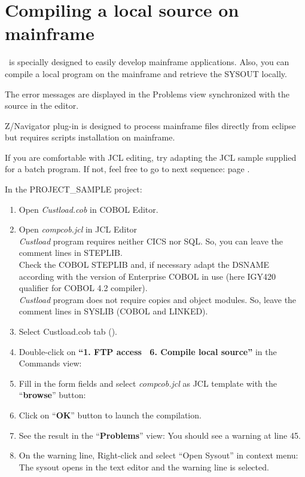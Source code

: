 \chapter{Compiling a local source on mainframe}

\mxproduct~is specially designed to easily develop mainframe applications. Also, you can compile a local program on the mainframe and retrieve the SYSOUT locally. 

The error messages are displayed in the Problems view synchronized with the source in the editor.

Z/Navigator plug-in is designed to process mainframe files directly from eclipse but requires scripts installation on mainframe.

If you are comfortable with JCL editing, try adapting the JCL sample supplied for a batch program. If not, feel free to go to next sequence:  page \pageref{chap:PDS}.

In the PROJECT\_SAMPLE project:

\begin{enumerate}
\item Open \textit{Custload.cob} in COBOL Editor.

\item Open \textit{compcob.jcl} in JCL Editor
\\[0.5ex]
\textit{Custload} program requires neither CICS nor SQL. So, you can leave the comment lines in STEPLIB.\\
Check the COBOL STEPLIB and, if necessary adapt the DSNAME according with the version of Enterprise COBOL in use (here IGY420 qualifier for COBOL 4.2 compiler).
\\[0.5ex]
\textit{Custload} program does not require copies and object modules. So, leave the comment lines in SYSLIB (COBOL and LINKED).

\item Select Custload.cob tab ().

\item Double-click on \textbf{``1. FTP access \RHD~6. Compile local source''} in the Commands view:

\item Fill in the form fields and select \textit{compcob.jcl} as JCL template with the ``\textbf{browse}'' button:

\item Click on ``\textbf{OK}'' button to launch the compilation.

\item See the result in the ``\textbf{Problems}'' view:
You should see a warning at line 45.

\item On the warning line, Right-click and select ``Open Sysout'' in context menu:
The sysout opens in the text editor and the warning line is selected.
\end{enumerate}
